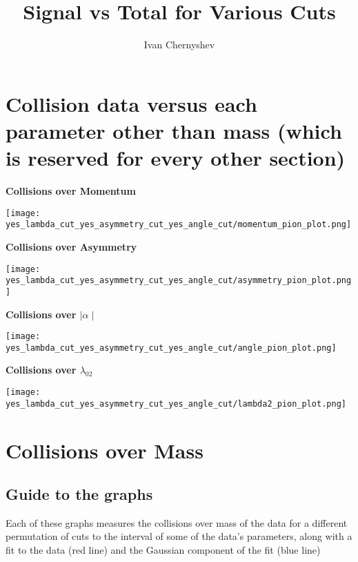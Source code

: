 \documentclass[11pt]{article}
\title{Signal vs Total for Various Cuts}
\author{Ivan Chernyshev}
\begin{document}
\maketitle

\section{Collision data versus each parameter other than mass (which is reserved for every other section)}

\begin{frame}{} %
\centering
\textbf{Collisions over Momentum}\par\medskip
\texttt{[image: yes\_lambda\_cut\_yes\_asymmetry\_cut\_yes\_angle\_cut/momentum\_pion\_plot.png]}
\end{frame}

\begin{frame}{} %
\centering
\textbf{Collisions over Asymmetry}\par\medskip
\texttt{[image: yes\_lambda\_cut\_yes\_asymmetry\_cut\_yes\_angle\_cut/asymmetry\_pion\_plot.png]}
\end{frame}

\begin{frame}{} %
\centering
\textbf{Collisions over $\mid\alpha\mid$}\par\medskip
\texttt{[image: yes\_lambda\_cut\_yes\_asymmetry\_cut\_yes\_angle\_cut/angle\_pion\_plot.png]}
\end{frame}

\begin{frame}{} %
\centering
\textbf{Collisions over $\lambda_{02}$}\par\medskip
\texttt{[image: yes\_lambda\_cut\_yes\_asymmetry\_cut\_yes\_angle\_cut/lambda2\_pion\_plot.png]}
\end{frame}

\section{Collisions over Mass}
\subsection{Guide to the graphs} %
Each of these graphs measures the collisions over mass of the data for a different permutation of cuts to the interval of some of  the data's parameters, along with a fit to the data (red line) and the Gaussian component of the fit (blue line)
\end{document}
